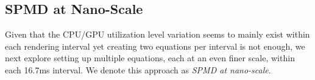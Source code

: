 \subsection{SPMD at Nano-Scale}
\label{sec:modelling_nano}


Given that the {\color{blue}CPU/GPU utilization level variation} seems to mainly exist within
each rendering interval yet creating two equations per interval is
not enough, we next explore setting up multiple equations, each
at an even finer scale, within each 16.7ms interval. We denote this
approach as {\it SPMD at nano-scale}.

